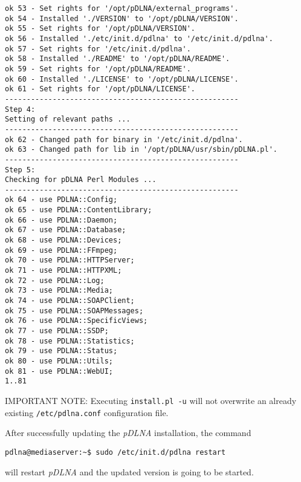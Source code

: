 \begin{lstlisting}
ok 53 - Set rights for '/opt/pDLNA/external_programs'.
ok 54 - Installed './VERSION' to '/opt/pDLNA/VERSION'.
ok 55 - Set rights for '/opt/pDLNA/VERSION'.
ok 56 - Installed './etc/init.d/pdlna' to '/etc/init.d/pdlna'.
ok 57 - Set rights for '/etc/init.d/pdlna'.
ok 58 - Installed './README' to '/opt/pDLNA/README'.
ok 59 - Set rights for '/opt/pDLNA/README'.
ok 60 - Installed './LICENSE' to '/opt/pDLNA/LICENSE'.
ok 61 - Set rights for '/opt/pDLNA/LICENSE'.
------------------------------------------------------
Step 4:
Setting of relevant paths ...
------------------------------------------------------
ok 62 - Changed path for binary in '/etc/init.d/pdlna'.
ok 63 - Changed path for lib in '/opt/pDLNA/usr/sbin/pDLNA.pl'.
------------------------------------------------------
Step 5:
Checking for pDLNA Perl Modules ...
------------------------------------------------------
ok 64 - use PDLNA::Config;
ok 65 - use PDLNA::ContentLibrary;
ok 66 - use PDLNA::Daemon;
ok 67 - use PDLNA::Database;
ok 68 - use PDLNA::Devices;
ok 69 - use PDLNA::FFmpeg;
ok 70 - use PDLNA::HTTPServer;
ok 71 - use PDLNA::HTTPXML;
ok 72 - use PDLNA::Log;
ok 73 - use PDLNA::Media;
ok 74 - use PDLNA::SOAPClient;
ok 75 - use PDLNA::SOAPMessages;
ok 76 - use PDLNA::SpecificViews;
ok 77 - use PDLNA::SSDP;
ok 78 - use PDLNA::Statistics;
ok 79 - use PDLNA::Status;
ok 80 - use PDLNA::Utils;
ok 81 - use PDLNA::WebUI;
1..81
\end{lstlisting}

\begin{colframeimportantnote}
\textsc{IMPORTANT NOTE:} Executing \verb|install.pl -u| will not overwrite an already existing \verb|/etc/pdlna.conf| configuration file.
\end{colframeimportantnote}

After successfully updating the {\em pDLNA} installation, the command
\begin{lstlisting}
pdlna@mediaserver:~$ sudo /etc/init.d/pdlna restart
\end{lstlisting}
will restart {\em pDLNA} and the updated version is going to be started.
